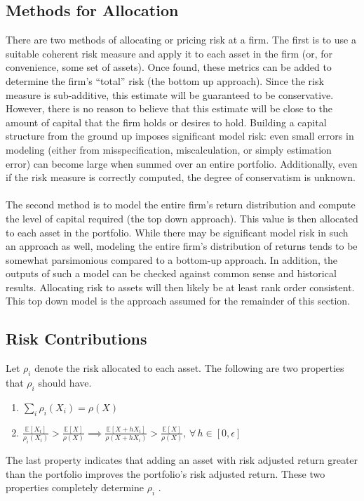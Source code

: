 \documentclass[12pt]{article}
\theoremstyle{definition}
\begin{document}
\subsection{Methods for Allocation}
There are two methods of allocating or pricing risk at a firm.  The first is to use a suitable coherent risk measure and apply it to each asset in the firm (or, for convenience, some set of assets).  Once found, these metrics can be added to determine the firm's ``total'' risk (the bottom up approach).  Since the risk measure is sub-additive, this estimate will be guaranteed to be conservative.  However, there is no reason to believe that this estimate will be close to the amount of capital that the firm holds or desires to hold.  Building a capital structure from the ground up imposes significant model risk:  even small errors in modeling (either from misspecification, miscalculation, or simply estimation error) can become large when summed over an entire portfolio.  Additionally, even if the risk measure is correctly computed, the degree of conservatism is unknown.
\\
\\
The second method is to model the entire firm's return distribution and compute the level of capital required (the top down approach).  This value is then allocated to each asset in the portfolio.  While there may be significant model risk in such an approach as well, modeling the entire firm's distribution of returns tends to be somewhat parsimonious compared to a bottom-up approach.  In addition, the outputs of such a model can be checked against common sense and historical results.  Allocating risk to assets will then likely be at least rank order consistent.  This top down model is the approach assumed for the remainder of this section. 

\subsection{Risk Contributions}
Let \(\rho_i\) denote the risk allocated to each asset.  The following are two properties that \(\rho_i\) should have.
\begin{enumerate} 
\item \(\sum_i \rho_i(X_i)=\rho(X)\) \label{props1}
\item \(\frac{\mathbb{E}[X_i]}{\rho_i(X_i)} >\frac{\mathbb{E}[X]}{\rho(X)} \implies \frac{\mathbb{E}[X+h X_i]}{\rho(X+h X_i)}>\frac{\mathbb{E}[X]}{\rho(X)},\,\forall \,h\in[0, \epsilon]\) \label{props2}
\end{enumerate}
The last property indicates that adding an asset with risk adjusted return greater than the portfolio improves the portfolio's risk adjusted return.  These two properties completely determine \(\rho_i\) \cite{tasche2007}.
\end{document}
